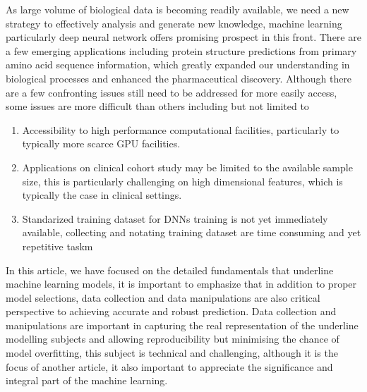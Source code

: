 As large volume of biological data is becoming readily available, we need a new strategy to effectively analysis and generate new knowledge, machine learning particularly deep neural network offers promising prospect in this front. There are a few emerging applications including protein structure predictions from primary amino acid sequence information, which greatly expanded our understanding in biological processes and enhanced the pharmaceutical discovery. Although there are a few confronting issues still need to be addressed for more easily access, some issues are more difficult than others including but not limited to 
\begin{enumerate}
    \item Accessibility to high performance computational facilities, particularly to typically more scarce GPU facilities. 
    \item Applications on clinical cohort study may be limited to the available sample size, this is particularly challenging on high dimensional features, which is typically the case in clinical settings. 
    \item Standarized training dataset for DNNs training is not yet immediately available, collecting and notating training dataset are time consuming and yet repetitive taskm
\end{enumerate}
\par
In this article, we have focused on the detailed fundamentals that underline machine learning models, it is important to emphasize that in addition to proper model selections, data collection and data manipulations are also critical perspective to achieving accurate and robust prediction. Data collection and manipulations are important in capturing the real representation of the underline modelling subjects and allowing reproducibility but minimising the chance of model overfitting, this subject is technical and challenging, although it is the focus of another article, it also important to appreciate the significance and integral part of the machine learning. 
\par 
